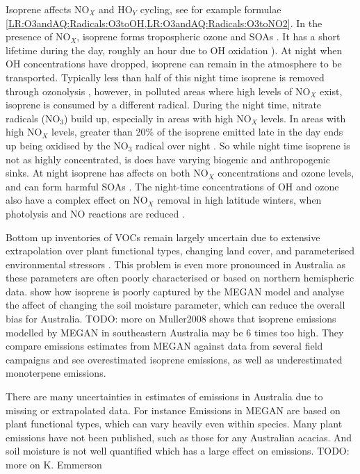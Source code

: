     Isoprene affects NO$_X$ and HO$_Y$ cycling, see for example formulae \ref{LR:O3andAQ:Radicals:O3toOH,LR:O3andAQ:Radicals:O3toNO2}.
    In the presence of NO$_X$, isoprene forms tropospheric ozone and SOAs \citep{Wagner2002, Millet2006}.
    It has a short lifetime during the day, roughly an hour due to OH oxidation \citep{AtkinsonArey2003}).
    At night when OH concentrations have dropped, isoprene can remain in the atmosphere to be transported. 
    Typically less than half of this night time isoprene is removed through ozonolysis \citep{AtkinsonArey2003}, however, in polluted areas where high levels of NO$_X$ exist, isoprene is consumed by a different radical.
    During the night time, nitrate radicals (NO$_3$) build up, especially in areas with high NO$_X$ levels.
    In areas with high NO$_X$ levels, greater than 20\% of the isoprene emitted late in the day ends up being oxidised by the NO$_3$ radical over night \citep{Brown2009}.
    So while night time isoprene is not as highly concentrated, is does have varying biogenic and anthropogenic sinks.
    At night isoprene has affects on both NO$_X$ concentrations and ozone levels, and can form harmful SOAs \citep{Brown2009, Mao2013}.
    The night-time  concentrations of OH and ozone also have a complex effect on NO$_X$ removal in high latitude winters, when photolysis and NO reactions are reduced \citep{Ayers2006}.
    
    Bottom up inventories of VOCs remain largely uncertain due to extensive extrapolation over plant functional types, changing land cover, and parameterised environmental stressors \citep{Guenther2000,Kanakidou2005}.
    This problem is even more pronounced in Australia as these parameters are often poorly characterised or based on northern hemispheric data.
    \cite{Muller2008} show how isoprene is poorly captured by the MEGAN model and analyse the affect of changing the soil moisture parameter, which can reduce the overall bias for Australia.
    TODO: more on Muller2008
    \cite{Emmerson2016} shows that isoprene emissions modelled by MEGAN in southeastern Australia may be 6 times too high. 
    They compare emissions estimates from MEGAN against data from several field campaigns and see overestimated isoprene emissions, as well as underestimated monoterpene emissions.
    
    There are many uncertainties in estimates of emissions in Australia due to missing or extrapolated data.
    For instance Emissions in MEGAN are based on plant functional types, which can vary heavily even within species.
    Many plant emissions have not been published, such as those for any Australian acacias.
    And soil moisture is not well quantified which has a large effect on emissions.
    TODO: more on K. Emmerson
    
